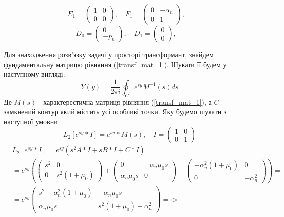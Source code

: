 \documentclass[a4paper,14pt]{extarticle}
\numberwithin{equation}{section}
\begin{document}
\begin{equation*}
    E_1 = \begin{pmatrix}
        1 & 0 \\
        0 & 0
    \end{pmatrix}, \quad
    F_1 = \begin{pmatrix}
        0 & -\alpha_n \\
        0 & 1
    \end{pmatrix}, \quad
\end{equation*}
\begin{equation*}
    D_0 = \begin{pmatrix}
        0 \\
        -p_n
    \end{pmatrix}, \quad
    D_1 = \begin{pmatrix}
        0 \\
        0
    \end{pmatrix}, \quad
\end{equation*}

Для знаходження розв'язку задачі у просторі трансформант, знайдем фундаментальну матрицю рівняння (\ref{transf_mat_1}).
Шукати її будем у наступному вигляді:
\begin{equation}
    Y(y) = \frac{1}{2\pi i} \oint_C e^{sy} M^{-1}(s)ds
\end{equation}
Де $M(s)$ - характерестична матриця рівняння (\ref{transf_mat_1}), а $C$ - замкнений контур який містить усі особливі точки. Яку будемо шукати з наступної умовни
\begin{equation}
    L_2\left[ e^{sy}*I \right] = e^{sy} * M(s), \quad I = \begin{pmatrix} 1 & 0 \\ 0 & 1 \end{pmatrix}
\end{equation}
\begin{align*}
    &L_2\left[ e^{sy}*I \right] = e^{sy} \left( s^2A * I + s B*I + C*I \right) = \\
    &=e^{sy} \left( \begin{pmatrix}
        s^2 & 0 \\
        0 & s^2 (1 + \mu_0)
    \end{pmatrix} + \begin{pmatrix}
        0 & -\alpha_n \mu_0 s\\
        \alpha_n \mu_0 s & 0
    \end{pmatrix} + \begin{pmatrix}
        -\alpha_n^2(1 + \mu_0) & 0 \\
        0 & -\alpha_n^2
    \end{pmatrix} \right) =  \\
    &=e^{sy} \begin{pmatrix}
        s^2 -\alpha_n^2(1 + \mu_0) & -\alpha_n \mu_0 s \\
        \alpha_n \mu_0 s & s^2 (1 + \mu_0) -\alpha_n^2
     \end{pmatrix} =>
\end{align*}
\end{document}
